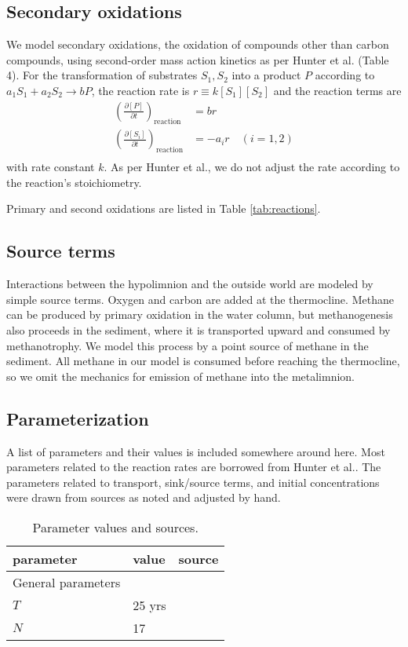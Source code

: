 \documentclass{report}
\newcommand{\pd}[2]{ \frac{\partial #1}{\partial #2} }
\begin{document}
\subsection{Secondary oxidations}
We model secondary oxidations, the oxidation of compounds other than carbon compounds, using
second-order mass action kinetics as per Hunter et al.\cite{hunterkinetic1998} (Table 4). For the
transformation of substrates $S_1, S_2$ into a product $P$ according to $a_1 S_1 + a_2 S_2
\to b P$, the reaction rate is $r \equiv k [S_1] [S_2]$ and the reaction terms are
\begin{align}
  \left( \pd{[P]}{t} \right)_\text{reaction} &= b r \\
  \left( \pd{[S_i]}{t} \right)_\text{reaction} &= -a_i r \quad \left( i = 1, 2 \right) \\
\end{align}
with rate constant $k$. As per Hunter et al., we do not adjust the rate according to the reaction's stoichiometry.

Primary and second oxidations are listed in Table \ref{tab:reactions}.

\subsection{Source terms}
Interactions between the hypolimnion and the outside world are modeled by simple source terms. Oxygen and carbon are added at the thermocline. Methane can be produced by primary oxidation in the water column, but methanogenesis also proceeds in the sediment, where it is transported upward and consumed by methanotrophy. We model this process by a point source of methane in the sediment.
All methane in our model is consumed before reaching the thermocline, so we omit the mechanics for emission of methane into the metalimnion.

\subsection{Parameterization}
A list of parameters and their values is included somewhere around here. Most parameters
related to the reaction rates are borrowed from Hunter et al.\cite{hunterkinetic1998}. The
parameters related to transport, sink/source terms, and initial concentrations were drawn
from sources as noted and adjusted by hand. 

\begin{table}
\centering
\begin{tabular}{ l l l }
\toprule
parameter   &   value   & source \\
\midrule
General parameters \\
$T$     & 25 yrs  \\
$N$     & 17    \\
\bottomrule
\end{tabular}
\label{tab:parameters}
\caption{Parameter values and sources.}
\end{table}
\end{document}
